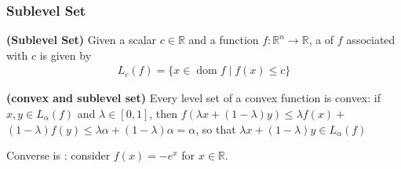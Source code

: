 \documentclass{article}
\newcommand{\bfs}[1]{\textbf{({#1}) }}
\newcommand{\dom}{\operatorname{dom}}
\begin{document}
\subsubsection{Sublevel Set}
\begin{defa}{\bfs{Sublevel Set}}
 Given a scalar $c \in \mathbb{R}$ and a function $f: \mathbb{R}^{n} \rightarrow \mathbb{R}$, a  of $f$ associated with $c$ is given by
\begin{align}
L_{c}(f)=\{x \in \dom  f \mid f(x) \leq c\}\label{eq:sublev_f}
\end{align}
\end{defa}
\begin{rema}{\bfs{convex and sublevel set}}
Every level set of a convex function is convex: if $x, y \in L_{\alpha}(f)$ and $\lambda \in[0,1]$, then $f(\lambda x+(1-\lambda) y) \leq \lambda f(x)+$ $(1-\lambda) f(y) \leq \lambda \alpha+(1-\lambda) \alpha=\alpha$, so that $\lambda x+(1-\lambda) y \in L_{\alpha}(f)$

Converse is : consider $f(x)=-e^{x}$ for $x \in \mathbb{R}$.
\end{rema} 
\end{document}
